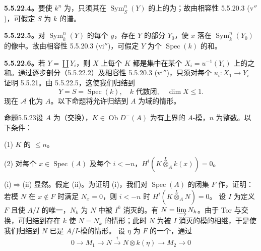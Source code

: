 \textbf{5.5.22.4。}要使 $k^n$ 为，只须其在 $\operatorname{Sym}^n_S(Y)$ 的上的为；故由相容性 5.5.20.3 (v$''$)，可假定 $S$ 为 $k$ 的谱。

\textbf{5.5.22.5。}对 $\operatorname{Sym}^n_k(Y)$ 的每个 $y$，存在 $Y$ 的部分 $Y_0$，使 $x$ 落在 $\operatorname{Sym}^n_k(Y_0)$ 的像中。故由相容性 5.5.20.3 (vi$''$)，可假定 $Y$ 为个 $\operatorname{Spec}(k)$ 的和。

\textbf{5.5.22.6。}若 $Y=\coprod Y_i$，则 $X$ 上每个 $K$ 都是集中在某个 $X_i=u^{-1}(Y_i)$ 上的之和。通过逐步剖分（5.5.22.2）及相容性 5.5.20.3 (vi$''$)，只须对每个 $u_i:X_1\to Y_i$ 证明 5.5.21。由 5.5.22.5，这使我们归结到
\[Y=S=\operatorname{Spec}(k),\quad k\text{ 代数闭},\quad\dim X\leq1.\]
现在 $\mathscr A$ 化为 $A$。以下命题将允许归结到 $A$ 为域的情形。
\begin{SGAresult}{命题}{5.5.23}设 $A$ 为（交换），$K\in\operatorname{Ob}D^-(A)$ 为有上界的 $A$-模，$n$ 为整数。以下条件：

(1) $K$ 的  $\leq n$。

(2) 对每个 $x\in\operatorname{Spec}(A)$ 及每个 $i<-n$，$H^i(K\overset L\otimes_A k(x))=0$。
\end{SGAresult}
(i)$\Rightarrow$(ii) 显然。假定 (ii)。为证明 (i)，我们对 $\operatorname{Spec}(A)$ 的闭集 $F$ 作，证明：若模 $N$ 在 $x\notin F$ 时满足 $N_x=0$，则 $i<-n$ 时 $H^i(K\overset L\otimes_A N)=0$。
设 $I$ 为定义 $F$ 且使 $A/I$ 的唯一，$N_k$ 为 $N$ 中被 $I^k$ 消灭的。有 $N=\varinjlim N_k$。由于 Tor 与交换，可归结到存在 $k$ 使 $N=N_k$ 的情形；此时 $N$ 为被 $I$ 消灭的模的相继，于是使我们归结到 $N$ 已是 $A/I$-模的情形。
设 $\eta$ 为 $F$ 的一个，通过
\begin{equation}\tag{5.5.23.1}0\longrightarrow M_1\longrightarrow N\xrightarrow i N\otimes k(\eta)\longrightarrow M_2\longrightarrow0\end{equation}
